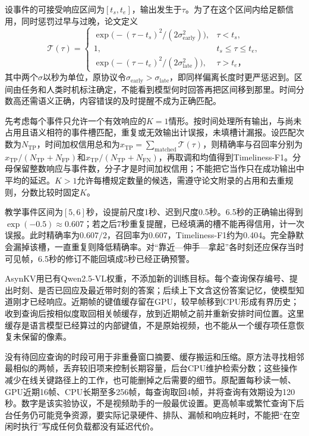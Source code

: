 设事件的可接受响应区间为$[t_s,t_e]$，输出发生于$\tau$。为了在这个区间内给足额信用，同时惩罚过早与过晚，论文定义
\begin{equation}
 \mathcal{T}(\tau)=
 \begin{cases}
  \exp\!\bigl(-(\tau-t_s)^2/(2\sigma_{\mathrm{early}}^2)\bigr),
    &\tau<t_s,\\
  1,&t_s\leq\tau\leq t_e,\\
  \exp\!\bigl(-(\tau-t_e)^2/(2\sigma_{\mathrm{late}}^2)\bigr),
    &\tau>t_e\text{，}
 \end{cases}
 \label{eq:vision-video-timeliness}
\end{equation}
其中两个$\sigma$以秒为单位，原协议令$\sigma_{\mathrm{early}}>\sigma_{\mathrm{late}}$，即同样偏离长度时更严惩迟到。区间由任务和人类时机标注确定，不能看到模型何时回答再把区间移到那里。时间分数高还需语义正确，内容错误的及时提醒不成为正确匹配。

先考虑每个事件只允许一个有效响应的$K=1$情形。按时间处理所有输出，与尚未占用且语义相符的事件槽匹配，重复或无效输出计误报，未填槽计漏报。设匹配次数为$N_{\mathrm{TP}}$，时间加权信用总和为$x_{\mathrm{TP}}=\sum_{\mathrm{matched}}\mathcal{T}(\tau)$，则精确率与召回率分别为$x_{\mathrm{TP}}/(N_{\mathrm{TP}}+N_{\mathrm{FP}})$和$x_{\mathrm{TP}}/(N_{\mathrm{TP}}+N_{\mathrm{FN}})$，再取调和均值得到Timeliness-F1。分母保留整数响应与事件数，分子才是时间加权信用；不能把它当作只在成功输出中平均的延迟。$K>1$允许每槽规定数量的候选，需遵守论文附录的占用和去重规则，分数比较时固定$K$。

教学事件区间为$[5,6]$秒，设提前尺度1秒、迟到尺度0.5秒。6.5秒的正确输出得到$\exp(-0.5)\approx0.607$；若之后7秒重复提醒，已经填满的槽不能再得信用，计一次误报。此时精确率为$0.607/2$，召回率为0.607，Timeliness-F1约为0.404。完全静默会漏掉该槽，一直重复则降低精确率。对“靠近—伸手—拿起”各时刻还应保存当时可见帧，6.5秒的修订不能回填成5秒已经正确预警。

AsynKV用已有Qwen2.5-VL权重，不添加新的训练目标。每个查询保存编号、提出时刻、是否已回应及最近带时刻的答案；后续上下文含这份答案记忆，使模型知道刚才已经响应。近期帧的键值缓存留在GPU，较早帧移到CPU形成有界历史；收到查询后按相似度取回相关帧缓存，放到近期帧之前并重新安排时间位置。这里缓存是语言模型已经算过的内部键值，不是原始视频，也不能从一个缓存项任意恢复未保留的像素。

没有待回应查询的时段可用于非重叠窗口摘要、缓存搬运和压缩。原方法寻找相邻最相似的两帧，丢弃较旧项来控制长期容量，后台CPU维护检索分数；这些操作减少在线关键路径上的工作，也可能删掉之后需要的细节。原配置每秒读一帧、GPU近期16帧、CPU长期至多256帧，每查询取回4帧，并将查询有效期设为120秒。数字是该实验协议，不是视频助手的一般最优设置。更高帧率或繁忙查询下后台任务仍可能竞争资源，要实际记录硬件、排队、漏帧和响应耗时，不能把“在空闲时执行”写成任何负载都没有延迟代价。

